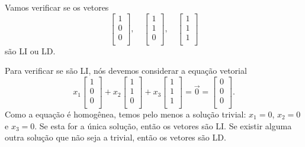 \documentclass[../livro.tex]{subfiles}
\begin{document}
\begin{example}\label{exp:1}
Vamos verificar se os vetores
\begin{equation}
\left[
  \begin{array}{c}
    1 \\
    0 \\
    0 \\
  \end{array}
\right], \quad
\left[
  \begin{array}{c}
    1 \\
    1 \\
    0 \\
  \end{array}
\right], \quad
\left[
  \begin{array}{c}
    1 \\
    1 \\
    1 \\
  \end{array}
\right]
\end{equation} são LI ou LD.

Para verificar se são LI, nós devemos considerar a equação vetorial
\begin{equation}
x_1 \left[
  \begin{array}{c}
    1 \\
    0 \\
    0 \\
  \end{array}
\right] +
x_2\left[
  \begin{array}{c}
    1 \\
    1 \\
    0 \\
  \end{array}
\right] +
x_3\left[
  \begin{array}{c}
    1 \\
    1 \\
    1 \\
  \end{array}
\right] = \vec{0} =
\left[
  \begin{array}{c}
    0 \\
    0 \\
    0 \\
  \end{array}
\right].
\end{equation} Como a equação é homogênea, temos pelo menos a solução trivial: $x_1 = 0$, $x_2=0$ e $x_3 = 0$. Se esta for a única solução, então os vetores são LI. Se existir alguma outra solução que não seja a trivial, então os vetores são LD.


\end{example}
\end{document}
